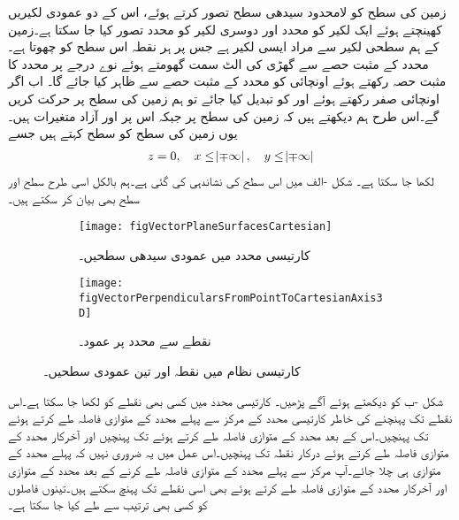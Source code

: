 زمین کی سطح کو لامحدود سیدھی سطح تصور کرتے ہوئے،  اس کے  دو عمودی لکیریں کھینچتے ہوئے ایک لکیر کو  محدد اور دوسری لکیر کو  محدد تصور کیا جا سکتا ہے۔زمین کے ہم سطحی لکیر سے مراد ایسی لکیر ہے جس پر ہر نقطہ اس سطح کو چھوتا ہے۔ محدد کے مثبت حصے  سے گھڑی کی الٹ سمت گھومتے ہوئے نوے درجے پر  محدد کا مثبت حصہ رکھتے ہوئے اونچائی کو  محدد کے مثبت حصے  سے ظاہر کیا جائے گا۔ اب اگر اونچائی صفر رکھتے ہوئے  اور  کو تبدیل کیا جائے تو ہم زمین کی سطح پر حرکت کریں گے۔اس طرح ہم دیکھتے ہیں کہ زمین کی سطح پر  جبکہ اس پر  اور  آزاد متغیرات ہیں۔یوں زمین کی سطح کو  سطح کہتے ہیں جسے
\begin{align*}
z=0, \quad  x\le \abs{\mp \infty}, \quad y \le \abs{\mp \infty}
\end{align*} 
لکھا جا سکتا ہے۔  شکل -الف میں اس سطح کی نشاندہی کی گئی ہے۔ہم بالکل اسی طرح  سطح اور  سطح بھی بیان کر سکتے ہیں۔

\begin{figure}
\begin{subfigure}{0.4\textwidth}
\centering
\texttt{[image: figVectorPlaneSurfacesCartesian]}
\caption{کارتیسی محدد میں عمودی سیدھی سطحیں۔}
\label{شکل_سمتیہ_کارتیسی_عمودی-تین_سطحیں}
\end{subfigure}%
%
\begin{subfigure}{0.4\textwidth}
\centering
\texttt{[image: figVectorPerpendicularsFromPointToCartesianAxis3D]}
\caption{نقطے سے محدد پر عمود۔}
\label{شکل_سمتیہ_نقطے_سے_کارتیسی_محدد_پر_عمود}
\end{subfigure}%
\caption{کارتیسی نظام میں نقطہ اور تین عمودی سطحیں۔}
\label{شکل_سمتیہ_کارتیسی_نقطہ_اور_عمودی_سطحیں}
\end{figure}
شکل  -ب  کو دیکھتے ہوئے آگے  پڑھیں۔ کارتیسی محدد میں کسی بھی نقطے کو  لکھا جا سکتا ہے۔اس نقطے تک پہنچنے کی خاطر  کارتیسی محدد کے مرکز سے پہلے  محدد کے متوازی   فاصلہ طے کرتے ہوئے  تک پہنچیں۔اس کے بعد  محدد کے متوازی  فاصلہ طے کرتے ہوئے  تک پہنچیں  اور آخرکار  محدد کے متوازی  فاصلہ طے کرتے ہوئے درکار نقطہ  تک پہنچیں۔اس عمل میں یہ ضروری نہیں کہ پہلے  محدد کے متوازی ہی چلا جائے۔آپ مرکز سے پہلے  محدد کے متوازی  فاصلہ طے کرنے کے بعد  محدد کے متوازی  اور آخرکار  محدد کے متوازی  فاصلہ طے کرتے ہوئے بھی اسی نقطے تک پہنچ سکتے ہیں۔تینوں فاصلوں کو کسی بھی ترتیب سے طے کیا جا سکتا ہے۔

